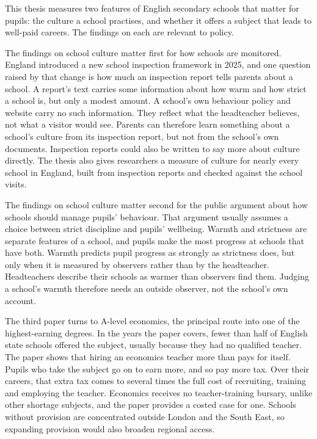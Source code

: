 
This thesis measures two features of English secondary schools that matter
for pupils: the culture a school practises, and whether it offers a subject
that leads to well-paid careers.
The findings on each are relevant to policy.

The findings on school culture matter first for how schools are monitored.
England introduced a new school inspection framework in 2025, and one
question raised by that change is how much an inspection report tells
parents about a school. A report's text carries some information about how
warm and how strict a school is, but only a modest amount. A
school's own behaviour policy and website carry no such information. They
reflect what the headteacher believes, not what a visitor would see. Parents
can therefore learn something about a school's culture from its inspection
report, but not from the school's own documents. Inspection reports could
also be written to say more about culture directly. The thesis also gives
researchers a measure of culture for nearly every school in England, built
from inspection reports and checked against the school visits.

The findings on school culture matter second for the public argument about
how schools should manage pupils' behaviour. That argument usually assumes a
choice between strict discipline and pupils' wellbeing. Warmth and
strictness are separate features of a school, and pupils make the most
progress at schools that have both. Warmth predicts pupil progress as
strongly as strictness does, but only when it is measured by observers
rather than by the headteacher. Headteachers describe their schools as
warmer than observers find them. Judging a school's warmth therefore needs
an outside observer, not the school's own account.

The third paper turns to A-level economics, the principal route into one of
the highest-earning degrees. In the years the paper covers, fewer than half
of English state schools offered the subject, usually because they had no
qualified teacher. The paper shows that hiring an economics
teacher more than pays for itself. Pupils who take the subject go on to
earn more, and so pay more tax. Over their careers, that extra tax comes to
several times the full cost of recruiting, training and employing the
teacher. Economics receives no teacher-training bursary,
unlike other shortage subjects, and the paper provides a costed case for
one. Schools without provision are concentrated outside London and the South
East, so expanding provision would also broaden regional access.

